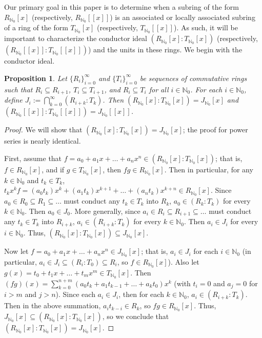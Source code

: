 \documentclass[12pt]{amsart}
\newtheorem{proposition}[theorem]{Proposition}
\theoremstyle{definition}
\newcommand{\bN}{\mathbb N}
\newcommand{\bNo}{{{\mathbb N}_0}}
\begin{document}

Our primary goal in this paper is to determine when a subring of the form $R_{\bN_0}[x]$ (respectively, $R_{\bN_0}[[x]]$) is an associated or locally associated subring of a ring of the form $T_{\bN_0}[x]$ (respectively, $T_{\bN_0}[[x]]$). As such, it will be important to characterize the conductor ideal $(R_{\bN_0}[x]:T_{\bN_0}[x])$ (respectively, $(R_{\bN_0}[[x]]:T_{\bN_0}[[x]])$) and the units in these rings. We begin with the conductor ideal.

\begin{proposition}
    \label{conductor ideal}
    Let $\{R_i\}_{i=0}^\infty$ and $\{T_i\}_{i=0}^\infty$ be sequences of commutative rings such that $R_i\subseteq R_{i+1}$, $T_i\subseteq T_{i+1}$, and $R_i\subseteq T_i$ for all $i\in\bN_0$. For each $i\in\bN_0$, define $J_i:=\bigcap_{k=0}^\infty (R_{i+k}:T_k)$. Then $(R_{\bN_0}[x]:T_{\bN_0}[x])=J_{\bN_0}[x]$ and $(R_{\bN_0}[[x]]:T_{\bN_0}[[x]])=J_{\bN_0}[[x]]$.
\end{proposition}

\begin{proof}
    We will show that $(R_{\bN_0}[x]:T_{\bN_0}[x])=J_{\bN_0}[x]$; the proof for power series is nearly identical.

    First, assume that $f=a_0+a_1x+\dots+a_nx^n\in (R_{\bN_0}[x]:T_{\bN_0}[x])$; that is, $f\in R_{\bN_0}[x]$, and if $g\in T_{\bN_0}[x]$, then $fg\in R_{\bN_0}[x]$. Then in particular, for any $k\in\bN_0$ and $t_k\in T_k$, $t_kx^kf=(a_0t_k)x^k+(a_1t_k)x^{k+1}+\dots+(a_nt_k)x^{k+n}\in R_{\bN_0}[x]$. Since $a_0\in R_0\subseteq R_1\subseteq\dots$ must conduct any $t_k\in T_k$ into $R_k$, $a_0\in (R_k:T_k)$ for every $k\in\bN_0$. Then $a_0\in J_0$. More generally, since $a_i\in R_i\subseteq R_{i+1}\subseteq\dots$ must conduct any $t_k\in T_k$ into $R_{i+k}$, $a_i\in (R_{i+k}:T_k)$ for every $k\in\bN_0$. Then $a_i\in J_i$ for every $i\in\bN_0$. Thus, $(R_{\bN_0}[x]:T_{\bN_0}[x])\subseteq J_{\bN_0}[x]$.

    Now let $f=a_0+a_1x+\dots+a_nx^n\in J_{\bNo}[x]$; that is, $a_i\in J_i$ for each $i\in\bNo$ (in particular, $a_i\in J_i\subseteq (R_i:T_0)\subseteq R_i$, so $f\in R_{\bNo}[x]$). Also let $g(x)=t_0+t_1x+\dots+t_mx^m\in T_{\bNo}[x]$. Then $(fg)(x)=\sum_{k=0}^{n+m}(a_0t_k+a_1t_{k-1}+\dots+a_kt_0)x^k$ (with $t_i=0$ and $a_j=0$ for $i>m$ and $j>n$). Since each $a_i\in J_i$, then for each $k\in\bN_0$, $a_i\in (R_{i+k}:T_k)$. Then in the above summation, $a_it_{k-i}\in R_k$, so $fg\in R_\bNo[x]$. Thus, $J_{\bNo}[x]\subseteq (R_{\bNo}[x]:T_{\bNo}[x])$, so we conclude that $(R_{\bNo}[x]:T_{\bNo}[x])= J_{\bNo}[x]$.
\end{proof}
\end{document}
